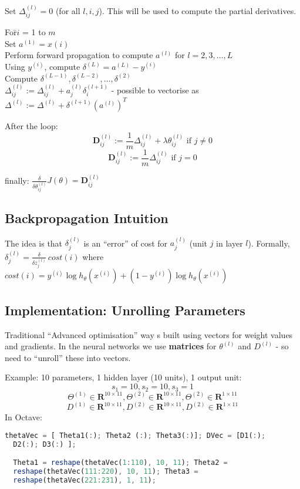 \documentclass{scrartcl}
\begin{document}
Set $\Delta_{ij}^{(l)} = 0$ (for all $l, i, j$). This will be used to
compute the partial derivatives.
\begin{tabbing}
  For\quad \=$i$ = 1 to $m$  \\
  \>Set $a^{(1)} = x{(i)}$ \\
  \>Perform forward propagation to compute $a^{(l)}$ for $l = 2, 3,
  \dots, L $ \\
  \>Using $y^{(i)}$, compute $\delta^{(L)} = a^{(L)} - y^{(i)}$ \\
  \>Compute $\delta^{(L-1)}, \delta^{(L-2)}, \dots, \delta^{(2)}$ \\
  \>$\Delta_{ij}^{(l)} := \Delta_{ij}^{(l)} + a_j^{(l)}
  \delta_i^{(l+1)}$ - possible to vectorise as $\Delta^{(l)} :=
  \Delta^{(l)} + \delta^{(l+1)}(a^{(l)})^T$ \\
\end{tabbing}   

After the loop:  
\[ \mathbf{D}_{ij}^{(l)} := \frac{1}{m}\Delta_{ij}^{(l)} + \lambda
\theta_{ij}^{(l)} \textrm{ if }j \ne 0 \]
\[ \mathbf{D}_{ij}^{(l)} := \frac{1}{m}\Delta_{ij}^{(l)} \textrm{ if }j
= 0\]

finally: $\frac{\delta}{\delta \theta_{ij}^{(l)}} J(\theta) =
\mathbf{D}_{ij}^{(l)}$

\subsection{Backpropagation Intuition}
\label{sec:9-3}

The idea is that $\delta_j^{(l)}$ is an ``error'' of cost for
$a_j^{(l)}$ (unit $j$ in layer $l$). Formally, $\delta_j^{(l)} =
\frac{\delta}{\delta z_j^{(l)}} \, cost(i)$ where $cost(i) = y^{(i)}
\log h_\theta(x^{(i)}) + (1 - y^{(i)}) \log h_\theta(x^{(i)})$

\subsection{Implementation: Unrolling Parameters}
\label{sec:9-4}
Traditional ``Advanced optimisation'' way s built using vectors for
weight values and gradients. In the neural networks we use{\bf
  matrices} for $\theta^{(l)}$ and $D^{(l)}$ - so need to ``unroll''
these into vectors.

Example: 10 parameters, 1 hidden layer (10 units), 1 output unit:
\[ s_1 = 10, s_2 = 10, s_3 = 1\]
\[ \Theta^{(1)} \in \mathbf{R}^{10\times11}, \Theta^{(2)} \in
\mathbf{R}^{10\times11}, \Theta^{(2)} \in \mathbf{R}^{1\times 11} \]
\[ D^{(1)} \in \mathbf{R}^{10\times11}, D^{(2)} \in
\mathbf{R}^{10\times11}, D^{(2)} \in \mathbf{R}^{1\times 11} \] In
Octave:
\begin{lstlisting}[language=Octave, caption=={Plugin function }]
  thetaVec = [ Theta1(:); Theta2 (:); Theta3(:)]; DVec = [D1(:);
  D2(:); D3(:) ];

  Theta1 = reshape(thetaVec(1:110), 10, 11); Theta2 =
  reshape(thetaVec(111:220), 10, 11); Theta3 =
  reshape(thetaVec(221:231), 1, 11);
\end{lstlisting}
\end{document}
